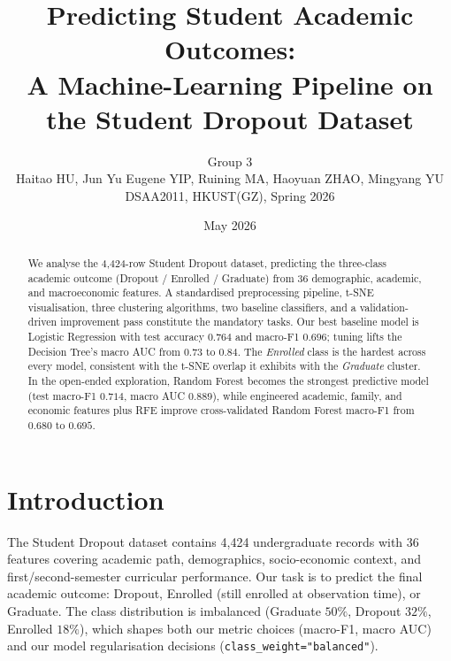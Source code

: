 \documentclass[11pt]{article}
\title{Predicting Student Academic Outcomes:\\
A Machine-Learning Pipeline on the Student Dropout Dataset}
\author{Group 3 \\
  Haitao HU, Jun Yu Eugene YIP, Ruining MA, Haoyuan ZHAO, Mingyang YU \\
  DSAA2011, HKUST(GZ), Spring 2026}
\date{May 2026}
\begin{document}
\maketitle

\begin{abstract}
  We analyse the 4{,}424-row Student Dropout dataset, predicting the
  three-class academic outcome (Dropout / Enrolled / Graduate) from 36
  demographic, academic, and macroeconomic features. A standardised
  preprocessing pipeline, t-SNE visualisation, three clustering
  algorithms, two baseline classifiers, and a validation-driven
  improvement pass constitute the mandatory tasks. Our best baseline
  model is Logistic Regression with test accuracy $0.764$ and
  macro-F1 $0.696$; tuning lifts the Decision Tree's macro AUC from
  $0.73$ to $0.84$. The \emph{Enrolled} class is the hardest across
  every model, consistent with the t-SNE overlap it exhibits with
  the \emph{Graduate} cluster. In the open-ended exploration,
  Random Forest becomes the strongest predictive model
  (test macro-F1 $0.714$, macro AUC $0.889$), while engineered
  academic, family, and economic features plus RFE improve
  cross-validated Random Forest macro-F1 from $0.680$ to $0.695$.
\end{abstract}

\section{Introduction}

The Student Dropout dataset \cite{uci_dropout} contains 4{,}424
undergraduate records with 36 features covering academic path,
demographics, socio-economic context, and first/second-semester
curricular performance. Our task is to predict the final academic
outcome: Dropout, Enrolled (still enrolled at observation time), or
Graduate. The class distribution is imbalanced
(Graduate $50\%$, Dropout $32\%$, Enrolled $18\%$), which shapes
both our metric choices (macro-F1, macro AUC) and our model
regularisation decisions (\texttt{class\_weight="balanced"}).
\end{document}
